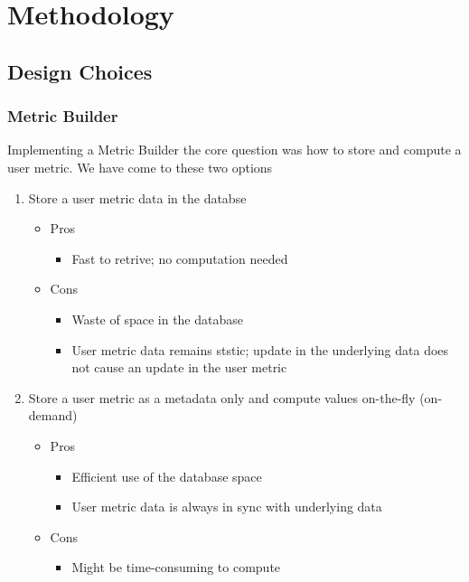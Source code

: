\chapter{Methodology}

\section{Design Choices}

	\subsection{Metric Builder}

		Implementing a Metric Builder the core question was how to store and compute a user metric. We have come to these two options

		\begin{enumerate}
			\item
				Store a user metric data in the databse
				\begin{itemize}
					\item
						Pros
						\begin{itemize}
							\item
								Fast to retrive; no computation needed
						\end{itemize}
					\item
						Cons
						\begin{itemize}
							\item
								Waste of space in the database
							\item
								User metric data remains ststic; update in the underlying data does not cause an update in the user metric
						\end{itemize}
				\end{itemize}
			\item
				Store a user metric as a metadata only and compute values on-the-fly (on-demand)
				\begin{itemize}
					\item
						Pros
						\begin{itemize}
							\item
								Efficient use of the database space
							\item
								User metric data is always in sync with underlying data
						\end{itemize}
					\item
						Cons
						\begin{itemize}
							\item
								Might be time-consuming to compute
						\end{itemize}
				\end{itemize}
		\end{enumerate}

